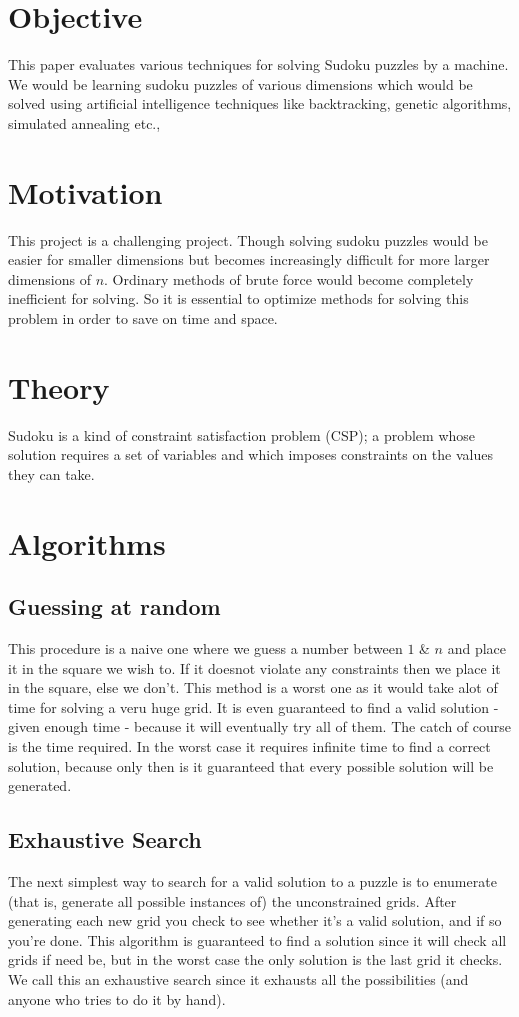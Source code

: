 \documentclass[fleqn,10pt]{SelfArx}
\begin{document}
\section{Objective}

This paper evaluates various techniques for solving Sudoku puzzles by a machine. We would be learning sudoku puzzles of various dimensions which would be solved using artificial intelligence techniques like backtracking, genetic algorithms, simulated annealing etc.,

\section{Motivation}

This project is a challenging project. Though solving sudoku puzzles would be easier for smaller dimensions but becomes increasingly difficult for more larger dimensions of $n$. Ordinary methods of brute force would become completely inefficient for solving. So it is essential to optimize methods for solving this problem in order to save on time and space.

\section{Theory}
Sudoku is a kind of constraint satisfaction problem (CSP); a problem whose solution requires a set of variables and which imposes constraints on the values they can take.

\section{Algorithms}
\subsection{Guessing at random}
This procedure is a naive one where we guess a number between $1$ \& $n$ and place it in the square we wish to. If it doesnot violate any constraints then we place it in the square, else we don't.
This method is a worst one as it would take alot of time for solving a veru huge grid. It is even guaranteed to find a valid solution - given enough time - because it will eventually try all
of them. The catch of course is the time required. In the worst case it requires infinite time to find
a correct solution, because only then is it guaranteed that every possible solution will be generated.
\subsection{Exhaustive Search}
The next simplest way to search for a valid solution to a puzzle is to enumerate (that is, generate
all possible instances of) the unconstrained grids. After generating each new grid you check to see
whether it’s a valid solution, and if so you’re done. This algorithm is guaranteed to find a solution
since it will check all grids if need be, but in the worst case the only solution is the last grid it checks.
We call this an exhaustive search since it exhausts all the possibilities (and anyone who tries to do it
by hand).
\end{document}
